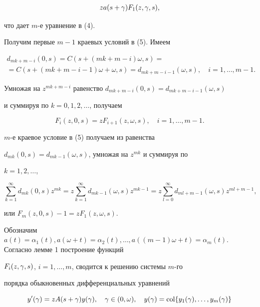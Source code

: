 \begin{pf}
\begin{gather*}
za(s+\g)F_{1}(z,\g,s),


\end{gather*}


что дает $m$-е уравнение в (4).


Получим первые $m-1$ краевых условий в (5). Имеем


\begin{gather*}


d_{{mk+m-i}}(0,s)=C(s+(mk+m-i)\omega,s)=\\


=C(s+(mk+m-i-1)\omega+\omega,s)=d_{mk+m-i-1}(\omega,s),\quad


i=1,\dotsc,m-1.


\end{gather*}


Умножая на $z^{mk+m-i}$ равенство $d_{mk+m-i}(0,s)=d_{mk+m-i-1}(\omega,s)$


и суммируя по $k=0,1,2,\dotsc$, получаем


$$


F_{i}(z,0,s)=zF_{i+1}(z,\omega,s),\quad i=1,\dotsc,m-1.


$$


$m$-е краевое условие в (5) получаем из равенства


$d_{mk}(0,s)=d_{mk-1}(\omega,s)$, умножая на $z^{mk}$ и суммируя по


$k=1,2,\dotsc$,


$$


\sum_{k=1}^\infty d_{mk}(0,s)z^{mk}=z


\sum_{k=1}^\infty d_{mk-1}(\omega,s)z^{mk-1}=


z\sum_{l=0}^\infty d_{ml+m-1}(\omega,s)z^{ml+m-1},


$$


или $F_m(z,0,s)-1=zF_1(z,\omega,s)$.


\end{pf}





Обозначим $a(t)=\alpha_1(t), a(\omega+t)=\alpha_2(t), \dotsc,


a((m-1)\omega+t)=\alpha_m(t)$. Согласно лемме 1 построение функций


$F_{i}(z,\gamma,s)$, $i=1,\dotsc, m$, сводится к решению системы $m$-го


порядка обыкновенных дифференциальных уравнений


\begin{equation}


y'(\g)=zA(s+\g)y(\g),\quad\g\in(0,\omega),


\quad y(\g)=\col\{y_1(\g),\dots,y_m(\g)\}


\end{equation}


